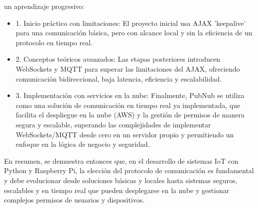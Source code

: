 \documentclass{report}
\begin{document}
\begin{itemize}
\begin{itemize}
        un aprendizaje progresivo:
        \begin{itemize}
            \item 1. Inicio práctico con limitaciones: El proyecto inicial usa AJAX 'keepalive' para una comunicación básica, pero 
            con alcance local y sin la eficiencia de un protocolo en tiempo real.
            \item 2. Conceptos teóricos avanzados: Las etapas posteriores introducen WebSockets y MQTT para superar las limitaciones 
            del AJAX, ofreciendo comunicación bidireccional, baja latencia, eficiencia y escalabilidad.
            \item 3. Implementación con servicios en la nube: Finalmente, PubNub se utiliza como una solución de comunicación en tiempo 
            real ya implementada, que facilita el despliegue en la nube (AWS) y la gestión de permisos de manera segura y escalable, 
            superando las complejidades de implementar WebSockets/MQTT desde cero en un servidor propio y permitiendo un enfoque en 
            la lógica de negocio y seguridad.
        \end{itemize}
    \end{itemize}
\end{itemize}
En resumen, se demuestra entonces que, en el desarrollo de sistemas IoT con Python y Raspberry Pi, la elección del protocolo de 
comunicación es fundamental y debe evolucionar desde soluciones básicas y locales hasta sistemas seguros, escalables y en tiempo 
real que pueden desplegarse en la nube y gestionar complejos permisos de usuarios y dispositivos.
\end{document}
